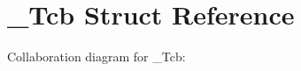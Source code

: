 \hypertarget{struct__Tcb}{}\section{\+\_\+\+Tcb Struct Reference}
\label{struct__Tcb}


Collaboration diagram for \+\_\+\+Tcb\+:
